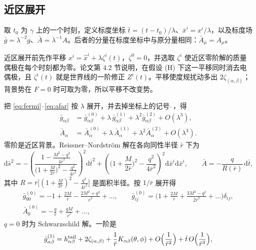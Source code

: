 \documentclass[11pt,a4paper]{ctexart}
\numberwithin{equation}{section}
\newcommand{\dd}{\mathrm d}
\begin{document}
\subsection{近区展开}

取 $t_0$ 为 $\gamma$ 上的一个时刻，定义标度坐标 $\bar t=(t-t_0)/\lambda$、$\bar x^i=x^i/\lambda$，以及标度场 $\bar g=\lambda^{-2}g$、$\bar A=\lambda^{-1}A$。后者的分量在标度坐标中与原分量相同：$\bar A_{\bar\mu}=A_\mu$。

近区展开前先作平移 $x^i=\hat x^i+\lambda\zeta^i(t)$，$\zeta^0=0$，并选取 $\zeta^i$ 使近区零阶解的质量偶极在每个时刻都为零。论文第 4.2 节说明，在假设 (H) 下这一平移同时消去电偶极，且 $\zeta^i(t)$ 就是世界线的一阶修正 $Z^i(t)$。平移使度规扰动多出 $2\zeta_{(\alpha,\beta)}$；背景势在 $F=0$ 时可取为零，所以平移不改变势。

把 \eqref{eq:fermi}--\eqref{eq:afar} 按 $\lambda$ 展开，并去掉坐标上的记号 $\hat{}\,$，得
\begin{align}
\bar g_{\alpha\beta}&=\bar g^{(0)}_{\alpha\beta}+\lambda\,\bar g^{(1)}_{\alpha\beta}+\lambda^2\bar g^{(2)}_{\alpha\beta}+O(\lambda^3),\\
\bar A_\alpha&=\bar A^{(0)}_\alpha+\lambda\,\bar A^{(1)}_\alpha+\lambda^2\bar A^{(2)}_\alpha+O(\lambda^3).
\end{align}
零阶是近区背景。Reissner--Nordstr\"om 解在各向同性半径 $\bar r$ 下为
\begin{equation}
\dd\bar s^2=-\left(\frac{1-\frac{M^2-q^2}{4\bar r^2}}{\big(1+\frac M{2\bar r}\big)^2-\frac{q^2}{4\bar r^2}}\right)^{\!2}\dd\bar t^2+\left(\Big(1+\frac M{2\bar r}\Big)^2-\frac{q^2}{4\bar r^2}\right)^{\!2}\dd\bar x^i\dd\bar x^i,\qquad
\bar A=-\frac{q}{R(\bar r)}\,\dd\bar t,
\end{equation}
其中 $R=\bar r\big[(1+\tfrac M{2\bar r})^2-\tfrac{q^2}{4\bar r^2}\big]$ 是面积半径。按 $1/\bar r$ 展开得
\begin{gather}
\bar g^{(0)}_{00}=-1+\frac{2M}{\bar r}-\frac{2M^2+q^2}{\bar r^2}+\dots,\qquad
\bar g^{(0)}_{ij}=\Big(1+\frac{2M}{\bar r}+\frac{3M^2-q^2}{2\bar r^2}+\dots\Big)\delta_{ij},\nonumber\\
\bar A^{(0)}_0=-\frac q{\bar r}+\frac{qM}{\bar r^2}+\dots,
\label{eq:RN}
\end{gather}
$q=0$ 时为 Schwarzschild 解。一阶是
\begin{equation}
\bar g^{(1)}_{\alpha\beta}=h^{\rm tail}_{\alpha\beta}+2\zeta_{(\alpha,\beta)}+\frac1{\bar r}K_{\alpha\beta}(\theta,\phi)+O\Big(\frac1{\bar r^2}\Big)+\bar t\,O\Big(\frac1{\bar r^3}\Big),
\end{equation}
\end{document}
